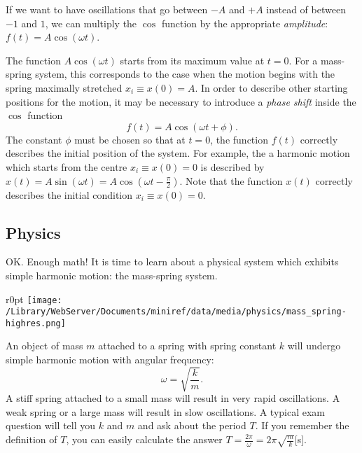 \documentclass[letterpaper,9pt,journal]{IEEEtran}
\newcommand{\be}{\begin{equation}}
\newcommand{\ee}{\end{equation}}
\begin{document}
If we want to have oscillations that go between $-A$ and $+A$ instead
of between $-1$ and $1$, we can multiply the $\cos$ function by the appropriate \emph{amplitude}:
$f(t)=A\cos(\omega t)$.

The function $A\cos(\omega t)$ starts from its maximum value at $t=0$.
For a mass-spring system, this corresponds to the case 
when the motion begins with the spring maximally stretched $x_i\equiv x(0)=A$. 
In order to describe other starting positions for the motion, 
it may be necessary to introduce a \emph{phase shift} inside the $\cos$ function
\[
 f(t)=A\cos(\omega t   + \phi).
\]
The constant $\phi$ must be chosen so that at $t=0$, the function $f(t)$ correctly 
describes the initial position of the system.
For example, the a harmonic motion which starts from the centre $x_i \equiv x(0)=0$
is described by $x(t) =  A\sin(\omega t)=A\cos\!\left(\omega t - \frac{\pi}{2}\right)$.
Note that the function $x(t)$ correctly describes the initial condition $x_i\equiv x(0)=0$.


\vspace{-3mm}
\subsection{Physics}

OK. Enough math! It is time to learn about a physical system which exhibits 
simple harmonic motion: the mass-spring system.
\begin{wrapfigure}{r}{0pt}
\texttt{[image: /Library/WebServer/Documents/miniref/data/media/physics/mass\_spring-highres.png]}
\end{wrapfigure}
An object of mass $m$ attached to a spring with spring constant $k$
will undergo simple harmonic motion with angular frequency:
\be
 \omega = \sqrt{ \frac{k}{m} }.	
 \label{OMEGA-MASS-SPRING}
\ee
A stiff spring attached to a small mass will result in very rapid oscillations.
A weak spring or a large mass will result in slow oscillations.
%
A typical exam question will tell you $k$ and $m$ and ask about the period $T$.
If you remember the definition of $T$, you can easily calculate the answer $T = \frac{2\pi}{\omega} =  2\pi \sqrt{ \frac{m}{k} }$[s].
\end{document}
